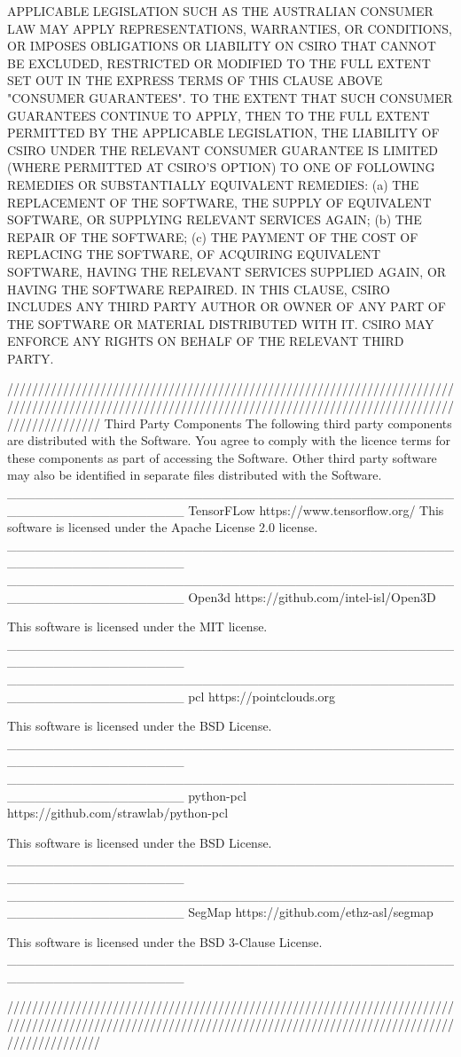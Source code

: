 APPLICABLE LEGISLATION SUCH AS THE AUSTRALIAN CONSUMER LAW MAY APPLY REPRESENTATIONS, WARRANTIES, OR CONDITIONS, OR IMPOSES OBLIGATIONS OR LIABILITY ON CSIRO THAT CANNOT BE EXCLUDED, RESTRICTED OR MODIFIED TO THE FULL EXTENT SET OUT IN THE EXPRESS TERMS OF THIS CLAUSE ABOVE "CONSUMER GUARANTEES".  TO THE EXTENT THAT SUCH CONSUMER GUARANTEES CONTINUE TO APPLY, THEN TO THE FULL EXTENT PERMITTED BY THE APPLICABLE LEGISLATION, THE LIABILITY OF CSIRO UNDER THE RELEVANT CONSUMER GUARANTEE IS LIMITED (WHERE PERMITTED AT CSIRO’S OPTION) TO ONE OF FOLLOWING REMEDIES OR SUBSTANTIALLY EQUIVALENT REMEDIES:
(a)               THE REPLACEMENT OF THE SOFTWARE, THE SUPPLY OF EQUIVALENT SOFTWARE, OR SUPPLYING RELEVANT SERVICES AGAIN;
(b)               THE REPAIR OF THE SOFTWARE;
(c)               THE PAYMENT OF THE COST OF REPLACING THE SOFTWARE, OF ACQUIRING EQUIVALENT SOFTWARE, HAVING THE RELEVANT SERVICES SUPPLIED AGAIN, OR HAVING THE SOFTWARE REPAIRED.
IN THIS CLAUSE, CSIRO INCLUDES ANY THIRD PARTY AUTHOR OR OWNER OF ANY PART OF THE SOFTWARE OR MATERIAL DISTRIBUTED WITH IT.  CSIRO MAY ENFORCE ANY RIGHTS ON BEHALF OF THE RELEVANT THIRD PARTY.

///////////////////////////////////////////////////////////////////////////////////////////////////////////////////////////////////////////////////////////////
Third Party Components
The following third party components are distributed with the Software.  You agree to comply with the licence terms for these components as part of accessing the Software.  Other third party software may also be identified in separate files distributed with the Software.
___________________________________________________________________
TensorFLow  https://www.tensorflow.org/
This software is licensed under the Apache License 2.0 license.
___________________________________________________________________
___________________________________________________________________
Open3d https://github.com/intel-isl/Open3D

This software is licensed under the MIT license.
___________________________________________________________________
___________________________________________________________________
pcl https://pointclouds.org

This software is licensed under the BSD License.
___________________________________________________________________
___________________________________________________________________
python-pcl https://github.com/strawlab/python-pcl

This software is licensed under the BSD License.
___________________________________________________________________
___________________________________________________________________
SegMap https://github.com/ethz-asl/segmap

This software is licensed under the BSD 3-Clause License.
___________________________________________________________________

///////////////////////////////////////////////////////////////////////////////////////////////////////////////////////////////////////////////////////////////



